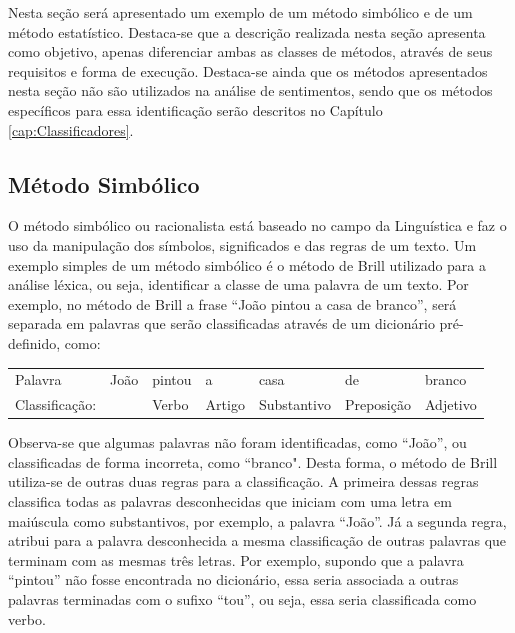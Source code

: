 Nesta seção será apresentado um exemplo de um método simbólico e de um método
estatístico.
Destaca-se que a descrição realizada nesta seção apresenta como objetivo, apenas
diferenciar ambas as classes de métodos, através de seus requisitos e forma de execução.
Destaca-se ainda que os métodos apresentados nesta seção não são utilizados na
análise de sentimentos, sendo que os métodos específicos para essa
identificação serão descritos no Capítulo \ref{cap:Classificadores}.


\subsection{Método Simbólico}
O método simbólico ou racionalista está
baseado no campo da Linguística e faz o uso da manipulação dos símbolos,
significados e das regras de um texto. Um exemplo simples de um método simbólico
é o método de Brill \cite{Brill:1992:SRP:974499.974526} utilizado para a
análise léxica, ou seja, identificar a classe de uma palavra de um texto.
Por exemplo, no método de Brill a frase ``João pintou a casa de branco'', será separada em palavras que
serão classificadas através de um dicionário pré-definido, como:

\begin{table}[htb]
\centering
\begin{tabular}{l|l|l|l|l|l|l}
Palavra         & João        & pintou & a      & casa        & de
& branco
\\
Classificação:   & 			   & Verbo  & Artigo & Substantivo & Preposição & Adjetivo
\end{tabular}
\label{my-label}
\end{table}

Observa-se que algumas palavras não foram
identificadas, como ``João'', ou classificadas de forma incorreta, como
``branco". Desta forma, o método de Brill utiliza-se de outras duas regras para
a classificação.
A primeira dessas regras classifica todas as palavras desconhecidas que
iniciam com uma letra em maiúscula como substantivos, por exemplo, a palavra ``João''. Já a
segunda regra, atribui para a palavra desconhecida a mesma classificação de outras palavras que terminam com as mesmas três letras. Por exemplo, supondo
que a palavra ``pintou'' não fosse encontrada no dicionário, essa seria
associada a outras palavras terminadas com o sufixo ``tou'', ou seja, essa seria
classificada como verbo.

